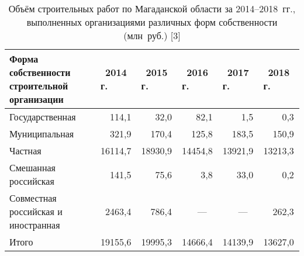 \begin{table}[h!]
\caption{Объём строительных работ по Магаданской области за 2014--2018~гг., выполненных организациями различных форм собственности (млн~руб.) [3]}
\label{tab:serebryakova-tab-1}
\begin{changemargin}{-0.5cm}{-1cm}
\begin{tabular}{llllll}
\toprule
Форма 			собственности строительной организации & \,\,\,2014 			г. & \,\,\,2015 			г. & \,\,\,2016 			г. & \,\,\,2017 			г. & \,\,\,2018 			г. \\
\midrule
Государственная                                 & \,\,\,\,\,\,114,1      & \,\,\,\,\,\,\,\,\,32,0       & \,\,\,\,\,\,\,\,\,82,1       & \,\,\,\,\,\,\,\,\,\,\,\,1,5        & \,\,\,\,\,\,\,\,\,\,\,\,0,3        \\
Муниципальная                                   & \,\,\,\,\,\,321,9      & \,\,\,\,\,\,170,4      & \,\,\,\,\,\,125,8      & \,\,\,\,\,\,183,5      & \,\,\,\,\,\,150,9      \\
Частная                                         & 16114,7    & 18930,9    & 14454,8    & 13921,9    & 13213,3    \\
Смешанная 			российская                         & \,\,\,\,\,\,141,5      &\,\,\,\,\,\,\,\,\,75,6       &  \,\,\,\,\,\,\,\,\,\,\,\,3,8        &  \,\,\,\,\,\,\,\,\,33,0       &  \,\,\,\,\,\,\,\,\,\,\,\,0,2        \\
Совместная 			российская и иностранная          & \,\,\,2463,4     &\,\,\,\,\,\,786,4      & \,\,\,\,\,\,\,\,\,\,---          & \,\,\,\,\,\,\,\,\,\,---          & \,\,\,\,\,\,262,3      \\
\midrule
Итого                                           & 19155,6    & 19995,3    & 14666,4    & 14139,9    & 13627,0 \\
\bottomrule
\end{tabular}
\end{changemargin}
\end{table}
